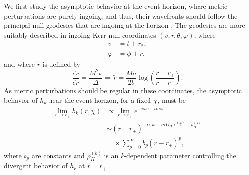 \documentclass[aps,prx,amsmath,floats,floatfix,twocolumn,
  superscriptaddress,nofootinbib,showpacs]{revtex4-1}
\begin{document}
We first study the asymptotic behavior at the event horizon, where metric perturbations are purely ingoing, and thus, their wavefronts should follow the principal null geodesics that are ingoing at the horizon \cite{Dias:2010eu, Dias:2014eua}.
The geodesics are more suitably described in ingoing Kerr null coordinates $(v, r, \theta, \varphi)$, where \cite{Poisson:2009pwt}
\begin{equation}
\begin{split}
v & = t + r_*, \\
\varphi & = \phi + \tilde{r}, 
\end{split}
\end{equation}
and where $\tilde{r}$ is defined by 
\begin{equation}
\frac{d \tilde{r}}{dr} = \frac{M^2 a}{\Delta} \Rightarrow \tilde{r} = \frac{M a}{2b} \log \left( \frac{r-r_+}{r-r_-}\right). 
\end{equation}
As metric perturbations should be regular in these coordinates, the asymptotic behavior of $h_k$ near the event horizon, for a fixed $\chi$, must be 
\begin{equation}
\label{eq:asymptotic_limits1}
\begin{split}
\lim \limits_{r \rightarrow r_+} h_k (r, \chi) & \propto \lim \limits_{r \rightarrow r_+}  e^{- i \omega v + i m \varphi}\\
& \sim \left( r-r_+ \right)^{-i (\omega - m \Omega_{H}) \frac{1+b}{b} - \rho_H^{(k)}} \\
& \quad \times \sum_{p=0}^{\infty} b_{p} (r-r_+)^{p}, 
\end{split}
\end{equation}
where $b_{p}$ are constants and $\rho_{H}^{(k)}$ is an $k$-dependent parameter controlling the divergent behavior of $h_{k}$ at $r=r_+$ \cite{Chung:2023zdq}.
\end{document}
